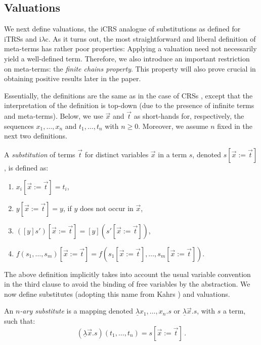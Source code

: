 \documentclass{LMCS}
\theoremstyle{plain}
\theoremstyle{definition}
\newcommand{\ulam}{\underline{\lambda}}
\newcommand{\iLC}{i$\lambda$c\xspace}
\begin{document}
\subsection{Valuations}

We next define valuations, the iCRS analogue of substitutions as defined for iTRSs and \iLC. As it turns out, the most straightforward and liberal definition of meta-terms has rather poor properties: Applying a valuation
need not necessarily yield a well-defined term. Therefore, we also introduce an important restriction on meta-terms: the \emph{finite chains property}. This property will also prove crucial in obtaining positive results later in the paper.

Essentially, the definitions are the same as in the case of CRSs \cite{KOR93,T03_R}, except that the interpretation of the definition is top-down (due to the presence of infinite terms and meta-terms). Below, we use $\vec{x}$ and $\vec{t}$ as short-hands for, respectively, the sequences $x_1, \ldots, x_n$ and $t_1, \ldots, t_n$ with $n \geq 0$. Moreover, we assume $n$ fixed in the next two definitions.
\begin{defi}
\label{defsubstitution}
A \emph{substitution} of terms 
$\vec{t}$ for distinct variables 
$\vec{x}$ in a term $s$, denoted $s[\vec{x} := \vec{t}]$, is defined as:
\begin{enumerate}[(1)]
\item
$x_i[\vec{x} := \vec{t}] = t_i$,
\item
$y[\vec{x} := \vec{t}] = y$, if $y$ does not occur in $\vec{x}$,
\item
$([y]s')[\vec{x} := \vec{t}] = [y](s'[\vec{x} := \vec{t}])$,
\item
$f(s_1, \ldots, s_m)[\vec{x} := \vec{t}] = f(s_1[\vec{x} := \vec{t}],
\ldots, s_m[\vec{x} := \vec{t}])$.
\end{enumerate}
\end{defi}
\noindent The above definition implicitly takes into account the usual variable
convention \cite{B85} in the third clause to avoid the binding of free
variables by the abstraction. We now define substitutes (adopting this
name from Kahrs \cite{K93}) and valuations.

\begin{defi}
\label{defsubstitute}
An \emph{$n$-ary substitute} is a mapping denoted $\ulam x_1, \ldots, x_n . s$ or $\ulam \vec{x} . s$, with $s$ a term, such that:
\begin{equation}
\label{pbetaeq}
(\ulam \vec{x} . s)(t_1, \ldots, t_n) = s[\vec{x} := \vec{t}] \, .
\end{equation}
\end{defi}
\end{document}
